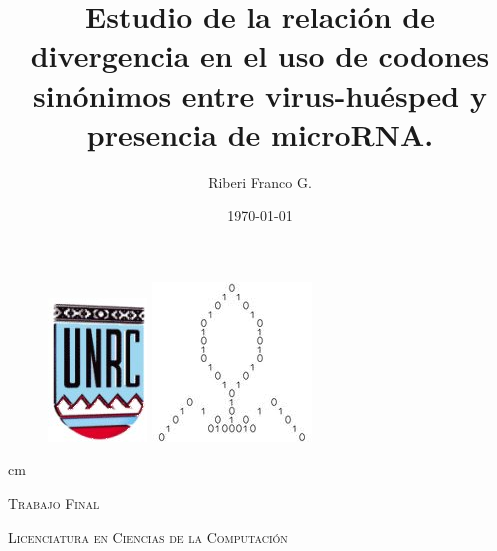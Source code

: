 \documentclass[12pt,a4paper]{report}
\begin{document}

\title{Estudio de la relación de divergencia en el uso de codones sinónimos entre virus-huésped y presencia de microRNA.}
\author{Riberi Franco G.}
\date{\today} 

\maketitle

\newpage
\thispagestyle{empty}

\begin{figure} [h]
	\begin{minipage}{.55\linewidth}
	\centering 
	\includegraphics[scale=0.65]{image/unrc.jpg}
	\end{minipage}
	\begin{minipage}{.45\linewidth}
	\centering 
	\includegraphics[scale=0.65]{image/logo.jpg}
	\end{minipage}
\end{figure}

 cm

\begin{center} \textsc{\normalsize Trabajo Final} \end{center}
\begin{center} \textsc{\normalsize Licenciatura en Ciencias de la Computación} \end{center}
\end{document}

